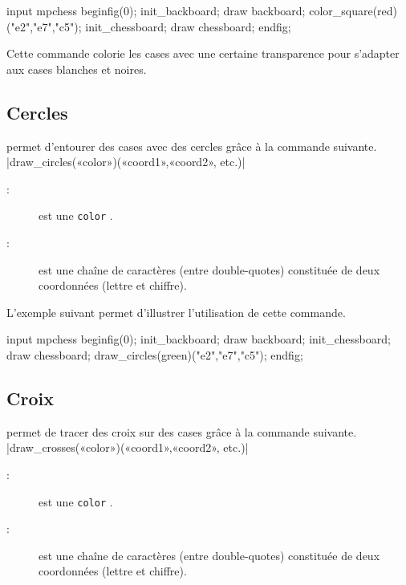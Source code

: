 \documentclass[french]{ltxdoc}
\begin{document}
\begin{ExempleMP}
input mpchess
beginfig(0);
init_backboard;
draw backboard;
color_square(red)("e2","e7","c5");
init_chessboard;
draw chessboard;
endfig;
\end{ExempleMP}

Cette commande colorie les cases avec une certaine transparence pour s’adapter
aux cases blanches et noires.

\subsection{Cercles}
\mpchess permet d’entourer des cases avec des cercles grâce à la commande
suivante.
\commande|draw_circles(«color»)(«coord1»,«coord2», etc.)|\smallskip

\begin{description}
\item[:] est une \lstinline+color+ \MP.
\item[:] est une chaîne de caractères (entre double-quotes) constituée de deux coordonnées (lettre et chiffre).
\end{description}

L’exemple suivant permet d’illustrer l’utilisation de cette commande.

\begin{ExempleMP}
input mpchess
beginfig(0);
init_backboard;
draw backboard;
init_chessboard;
draw chessboard;
draw_circles(green)("e2","e7","c5");
endfig;
\end{ExempleMP}



\subsection{Croix}


\mpchess permet de tracer des croix sur des cases  grâce à la commande
suivante.
\commande|draw_crosses(«color»)(«coord1»,«coord2», etc.)|\smallskip

\begin{description}
  \item[:] est une \lstinline+color+ \MP.
  \item[:] est une chaîne de caractères (entre double-quotes) constituée de deux coordonnées (lettre et chiffre).
  \end{description}
\end{document}
